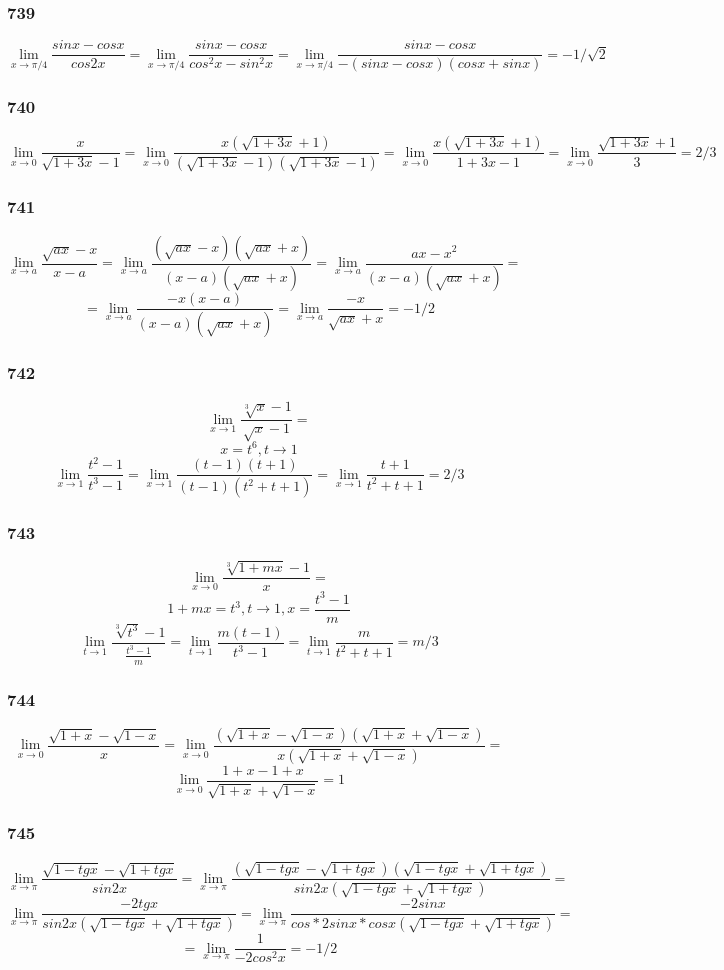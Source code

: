 \documentclass[12pt]{article}
\begin{document}
\newpage
\subsubsection{739}
$$
\lim_{x\to \pi/4} \frac{sinx-cosx}{cos2x}=
\lim_{x\to \pi/4} \frac{sinx-cosx}{cos^2 x- sin^2 x}=
\lim_{x\to \pi/4} \frac{sinx-cosx}{-(sinx-cosx)(cos x+ sin x)}=
-1/\sqrt{2}
$$

\newpage
\subsubsection{740}
$$
\lim_{x\to 0} \frac{x}{\sqrt{1+3x}-1}=
\lim_{x\to 0} \frac{x(\sqrt{1+3x}+1)}{(\sqrt{1+3x}-1)(\sqrt{1+3x}-1)}=
\lim_{x\to 0} \frac{x(\sqrt{1+3x}+1)}{1+3x-1}=
\lim_{x\to 0} \frac{\sqrt{1+3x}+1}{3}=2/3
$$

\newpage
\subsubsection{741}
$$
\lim_{x\to a} \frac{\sqrt{ax}-x}{x-a}=
\lim_{x\to a} \frac{(\sqrt{ax}-x)(\sqrt{ax}+x)}{(x-a)(\sqrt{ax}+x)}=
\lim_{x\to a} \frac{ax-x^2}{(x-a)(\sqrt{ax}+x)}=
$$
$$
=\lim_{x\to a} \frac{-x(x-a)}{(x-a)(\sqrt{ax}+x)}=\lim_{x\to a} \frac{-x}{\sqrt{ax}+x}=-1/2
$$


\newpage
\subsubsection{742}

$$
\lim_{x\to 1} \frac{\sqrt[3]{x}-1}{\sqrt{x}-1}=
$$
$$
x=t^6, t \to 1
$$
$$
\lim_{x\to 1} \frac{t^2-1}{t^3-1}=
\lim_{x\to 1} \frac{(t-1)(t+1)}{(t-1)(t^2+t+1)}=
\lim_{x\to 1} \frac{t+1}{t^2+t+1}=2/3
$$

\newpage
\subsubsection{743}

$$
\lim_{x\to 0} \frac{\sqrt[3]{1+mx}-1}{x}=
$$
$$
1+mx = t^3, t \to 1, x = \frac{t^3-1}{m}
$$
$$
\lim_{t\to 1} \frac{\sqrt[3]{t^3}-1}{\frac{t^3-1}{m}}=
\lim_{t\to 1} \frac{m(t-1)}{t^3-1}=
\lim_{t\to 1} \frac{m}{t^2+t+1}=m/3
$$

\newpage
\subsubsection{744}

$$
\lim_{x\to 0} \frac{\sqrt{1+x}-\sqrt{1-x}}{x}=
\lim_{x\to 0} \frac{(\sqrt{1+x}-\sqrt{1-x})(\sqrt{1+x}+\sqrt{1-x})}{x(\sqrt{1+x}+\sqrt{1-x})}=
$$
$$
\lim_{x\to 0} \frac{1+x-1+x}{\sqrt{1+x}+\sqrt{1-x}}=1
$$

\newpage
\subsubsection{745}

$$
\lim_{x\to \pi} \frac{\sqrt{1-tgx}-\sqrt{1+tgx}}{sin2x}=
\lim_{x\to \pi} \frac{(\sqrt{1-tgx}-\sqrt{1+tgx})(\sqrt{1-tgx}+\sqrt{1+tgx})}{sin2x(\sqrt{1-tgx}+\sqrt{1+tgx})}=
$$
$$
\lim_{x\to \pi} \frac{-2tgx}{sin2x(\sqrt{1-tgx}+\sqrt{1+tgx})}=
\lim_{x\to \pi} \frac{-2sinx}{cos*2sinx*cosx(\sqrt{1-tgx}+\sqrt{1+tgx})}=
$$
$$
=\lim_{x\to \pi} \frac{1}{-2cos^2 x}=-1/2
$$
\end{document}
